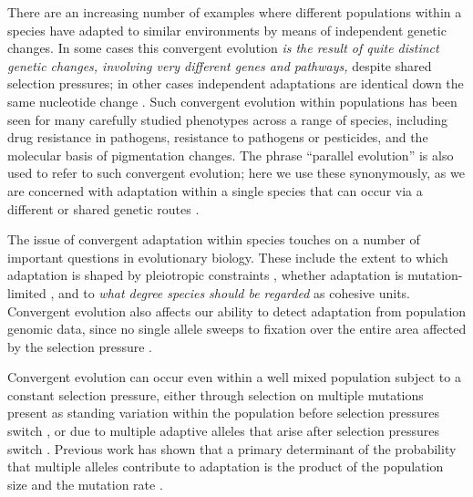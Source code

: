 \documentclass{article}
\newcommand{\mfp}[1]{{\it\color{red}#1}}
\begin{document}
There are an increasing number of examples where
different populations within a species have
adapted to similar environments by means of independent genetic changes. 
In some cases this convergent evolution \mfp{is the result of quite
distinct genetic changes, involving very different genes and pathways,} despite shared selection pressures; 
in other cases independent adaptations are identical down the same
nucleotide change
\citep{Jeong20141,stern2013genetic,MartinOrgogozo:13, Conte2012}. 
Such convergent evolution within populations has been seen for many
carefully studied phenotypes across a range of species, 
including drug resistance in pathogens,
resistance to pathogens or pesticides,
and the molecular basis of pigmentation changes.
The phrase ``parallel evolution'' is also used to refer to such convergent evolution;
here we use these synonymously, 
as we are concerned with adaptation within a single
species that can occur via a different or shared genetic routes \citep[see][for more discussion]{Arendt:08}.

The issue of convergent adaptation within species touches on a number
of important questions in evolutionary biology. 
These include the extent to which adaptation is shaped by pleiotropic constraints \citep{Haldane:book,Orr:05},
whether adaptation is mutation-limited \citep{Bradshaw:91,karasov2010}, 
and to \mfp{what degree species should be regarded} as cohesive units. 
Convergent evolution also affects our ability to detect adaptation from population genomic data,
since no single allele sweeps to fixation over the entire area affected by the selection pressure \citep{softsweepsIII}.

Convergent evolution can occur even within a well mixed population
subject to a constant selection pressure, 
either through selection on multiple mutations present as standing variation within the population
before selection pressures switch \citep{Orr:01,softsweepsI},
or due to multiple adaptive alleles that arise after selection pressures switch \citep{softsweepsII}. 
Previous work has shown that 
a primary determinant of the probability that multiple alleles contribute to adaptation
is the product of the population size and the mutation rate \citep[see][for a review]{MesserPetrov}. 
\end{document}
